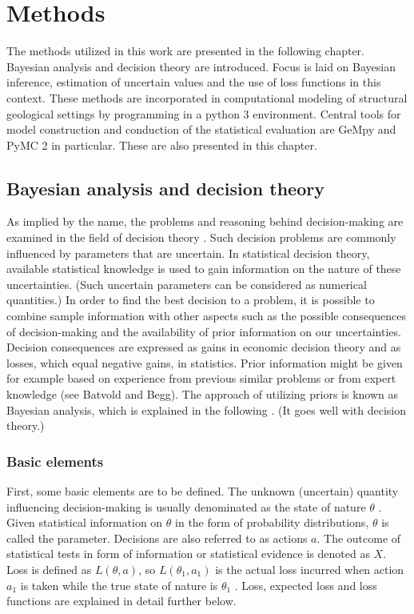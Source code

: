     \chapter{Methods}\label{cha:met}

    The methods utilized in this work are presented in the following chapter. Bayesian analysis and decision theory are introduced. Focus is laid on Bayesian inference, estimation of uncertain values and the use of loss functions in this context. These methods are incorporated in computational modeling of structural geological settings by programming in a python 3 environment. Central tools for model construction and conduction of the statistical evaluation are GeMpy and PyMC 2 in particular. These are also presented in this chapter.
    
        \section{Bayesian analysis and decision theory}\label{sec:bayes}
	    As implied by the name, the problems and reasoning behind decision-making are examined in the field of decision theory \citep{berger2013stat}. Such decision problems are commonly influenced by parameters that are uncertain. In statistical decision theory, available statistical knowledge is used to gain information on the nature of these uncertainties. (Such uncertain parameters can be considered as numerical quantities.) In order to find the best decision to a problem, it is possible to combine sample information with other aspects such as the possible consequences of decision-making and the availability of prior information on our uncertainties. Decision consequences are expressed as gains in economic decision theory and as losses, which equal negative gains, in statistics. Prior information might be given for example based on experience from previous similar problems or from expert knowledge (see Batvold and Begg). The approach of utilizing priors is known as Bayesian analysis, which is explained in the following \citep{berger2013stat}. (It goes well with decision theory.)
	    
	    \subsection{Basic elements}
	    First, some basic elements are to be defined. The unknown (uncertain) quantity influencing decision-making is usually denominated as the state of nature $\theta$ \citep{berger2013stat}. Given statistical information on $\theta$ in the form of probability distributions, $\theta$ is called the parameter. 
	    Decisions are also referred to as actions $a$.
	    The outcome of statistical tests in form of information or statistical evidence is denoted as $X$.	    
	    Loss is defined as $L(\theta,a)$, so $L(\theta_1,a_1)$ is the actual loss incurred when action $a_1$ is taken while the true state of nature is $\theta_1$ \citep{berger2013stat}. Loss, expected loss and loss functions are explained in detail further below.  
        
